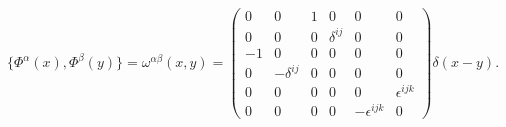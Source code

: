 \begin{equation}\label{omega}
\{\Phi^\alpha(x), \Phi^\beta(y) \}=\omega^{\alpha\beta}(x,y) =
\left(
\begin{array}{cccccc}
0 & 0 & 1 & 0 & 0 & 0\\
0 & 0 & 0 & \delta^{ij} & 0 & 0\\
-1 & 0 & 0 & 0 & 0 & 0 \\
0 & - \delta^{ij} & 0 & 0 & 0 & 0 \\
0 & 0 & 0 & 0 & 0 & \epsilon^{ijk} \\
0 & 0 & 0 & 0 & -\epsilon^{ijk}& 0
\end{array}\right)\delta(x-y).
\end{equation}

